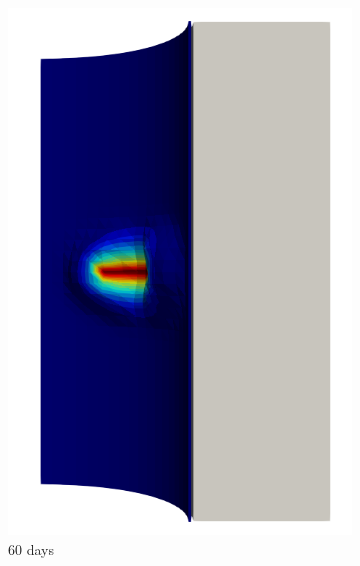 \begin{figure}[!htb]
\begin{subfigure}[b]{0.2\textwidth}
    \includegraphics[width=\textwidth]{Chapter5/figures/spallation/seed_d_2}
    \caption{60 days}
  \end{subfigure}
  \begin{subfigure}[b]{0.2\textwidth}
    \centering

\end{subfigure}
\end{figure}
